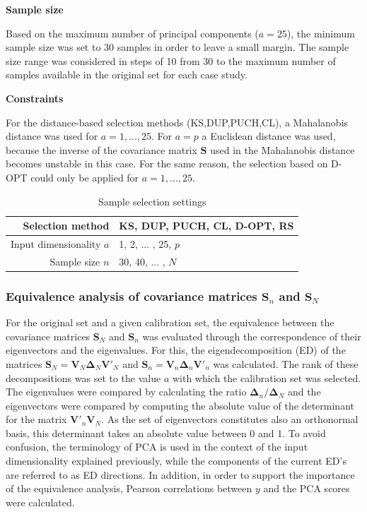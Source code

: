 \documentclass[journal=ancham,manuscript=article]{achemso}
\begin{document}
\textbf{Sample size}

Based on the maximum number of principal components ($a=25$), the minimum sample size was set to 30 samples in order to leave a small margin. The sample size range was considered in steps of 10 from 30 to the maximum number of samples available in the original set for each case study. 

\textbf{Constraints}

For the distance-based selection methods (KS,DUP,PUCH,CL), a Mahalanobis distance was used for $a=1,...,25$.  For $a=p$ a Euclidean distance was used, because the inverse of the covariance matrix $\mathbf{S}$ used in the Mahalanobis distance becomes unstable in this case. For the same reason, the selection based on D-OPT could only be applied for $a=1,...,25$. 

\begin{table}[t]
\centering
\begin{tabular}{|r|l|} 
\hline
Selection method & KS, DUP, PUCH, CL, D-OPT, RS\\
\hline
Input dimensionality $a$ & 1, 2, ... , 25, $p$ \\
\hline
Sample size $n$ & 30, 40, ... , $N$ \\
\hline

\end{tabular}
\caption{Sample selection settings}
\label{tab_samplesel_settings_exhaustive_search}
\end{table}

\subsubsection{Equivalence analysis of covariance matrices $\mathbf{S}_n$ and $\mathbf{S}_N$}

For the original set and a given calibration set, the equivalence between the covariance matrices $\mathbf{S}_N$ and $\mathbf{S}_n$ was evaluated through the correspondence of their eigenvectors and the eigenvalues. For this, the eigendecomposition (ED) of the matrices $\mathbf{S}_N = \mathbf{V}_N \mathbf{\Delta}_N \mathbf{V}'_N$ and $\mathbf{S}_n = \mathbf{V}_n \mathbf{\Delta}_n \mathbf{V}'_n$ was calculated. The rank of these decompositions was set to the value $a$ with which the calibration set was selected. The eigenvalues were compared by calculating the ratio  $\mathbf{\Delta}_n/\mathbf{\Delta}_N$ and the eigenvectors were compared by computing the absolute value of the determinant for the matrix $\mathbf{V}'_n\mathbf{V}_N$. As the set of eigenvectors constitutes also an orthonormal basis, this determinant takes an absolute value between 0 and 1. To avoid confusion, the terminology of PCA is used in the context of the input dimensionality explained previously, while the components of the current ED's are referred to as ED directions. 
In addition, in order to support the importance of the equivalence analysis, Pearson correlations between $y$ and the PCA scores were calculated.
\end{document}

